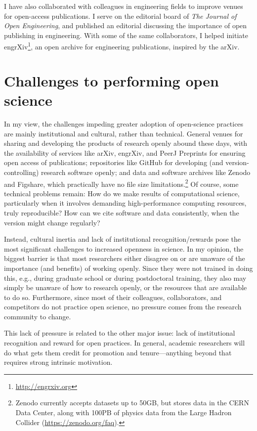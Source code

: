 \documentclass[nobib]{tufte-handout}
\begin{document}
I have also collaborated with colleagues in engineering fields to improve
venues for open-access publications. I serve on the editorial board of
\textit{The Journal of Open Engineering},
and published an editorial discussing the importance of open publishing in
engineering\autocite{TJOE:editorial}. With some of the same collaborators, I
helped initiate engrXiv\footnote{\url{http://engrxiv.org}}, an open archive
for engineering publications, inspired by the arXiv.


\section{Challenges to performing open science}
\label{sec:challenges}

In my view, the challenges impeding greater adoption of open-science practices
are mainly institutional and cultural, rather than technical. General venues for sharing
and developing the products of research openly abound these days, with the availability
of services like arXiv, engrXiv, and PeerJ Preprints for ensuring open access of
publications; repositories like GitHub for developing (and version-controlling)
research software openly; and data and software archives like Zenodo and Figshare,
which practically have no file size limitations.\footnote{Zenodo currently accepts
datasets up to 50GB, but stores data in the CERN Data Center, along with 100PB of
physics data from the Large Hadron Collider (\url{https://zenodo.org/faq}).}
Of course, some technical problems remain: How do we make results of computational
science, particularly when it involves demanding high-performance computing resources,
truly reproducible? How can we cite software and data consistently, when
the version might change regularly?

Instead, cultural inertia and lack of institutional recognition\slash rewards pose
the most significant challenges to increased openness in science. In my opinion,
the biggest barrier is that most researchers either disagree on or are unaware of
the importance (and benefits) of working openly. Since they were not trained in
doing this, e.g., during graduate school or during postdoctoral training, they
also may simply be unaware of how to research openly, or the resources that are
available to do so. Furthermore, since most of their colleagues, collaborators,
and competitors do not practice open science, no pressure comes from the
research community to change.

This lack of pressure is related to the other major issue: lack of institutional
recognition and reward for open practices. In general, academic researchers will
do what gets them credit for promotion and tenure---anything beyond that requires
strong intrinsic motivation.

%
%
\printbibliography
\end{document}
